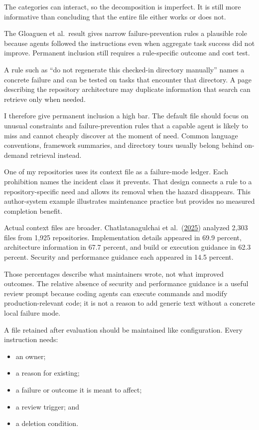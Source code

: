 The categories can interact, so the decomposition is imperfect. It is still more informative than concluding that the entire file either works or does not.

The Gloaguen et al.~result gives narrow failure-prevention rules a plausible role because agents followed the instructions even when aggregate task success did not improve. Permanent inclusion still requires a rule-specific outcome and cost test.

A rule such as ``do not regenerate this checked-in directory manually'' names a concrete failure and can be tested on tasks that encounter that directory. A page describing the repository architecture may duplicate information that search can retrieve only when needed.

I therefore give permanent inclusion a high bar. The default file should focus on unusual constraints and failure-prevention rules that a capable agent is likely to miss and cannot cheaply discover at the moment of need. Common language conventions, framework summaries, and directory tours usually belong behind on-demand retrieval instead.

One of my repositories uses its context file as a failure-mode ledger. Each prohibition names the incident class it prevents. That design connects a rule to a repository-specific need and allows its removal when the hazard disappears. This author-system example illustrates maintenance practice but provides no measured completion benefit.

Actual context files are broader. Chatlatanagulchai et al.~(\href{https://arxiv.org/abs/2511.12884}{2025}) analyzed 2,303 files from 1,925 repositories. Implementation details appeared in 69.9 percent, architecture information in 67.7 percent, and build or execution guidance in 62.3 percent. Security and performance guidance each appeared in 14.5 percent.

Those percentages describe what maintainers wrote, not what improved outcomes. The relative absence of security and performance guidance is a useful review prompt because coding agents can execute commands and modify production-relevant code; it is not a reason to add generic text without a concrete local failure mode.


A file retained after evaluation should be maintained like configuration. Every instruction needs:

\begin{itemize}
\tightlist
\item
  an owner;
\item
  a reason for existing;
\item
  a failure or outcome it is meant to affect;
\item
  a review trigger; and
\item
  a deletion condition.
\end{itemize}

